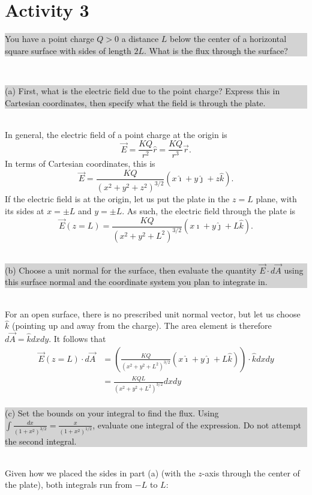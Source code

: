 \documentclass[]{article}
\newcommand{\excerpt}[1]{\colorbox{lightgray}{\parbox{14.8cm}{#1}} \\}
\begin{document}
\pagebreak
\section*{Activity 3}
\excerpt{
You have a point charge $ Q > 0 $ a distance $ L $ below the center of a horizontal square surface with sides of length $ 2L $. What is the flux through the surface?
}
\excerpt{
(a) First, what is the electric field due to the point charge? Express this in Cartesian coordinates, then specify what the field is through the plate.
}


In general, the electric field of a point charge at the origin is
\[
\vec{E} = \frac{KQ}{r^{2}}\hat{r} = \frac{KQ}{r^{3}}\vec{r}.
\]
In terms of Cartesian coordinates, this is
\[
\vec{E} = \frac{KQ}{(x^{2}+y^{2}+z^{2})^{3/2}}(x\hat{\imath}+y\hat{\jmath}+z\hat{k}).
\]
If the electric field is at the origin, let us put the plate in the $ z = L $ plane, with its sides at $ x = \pm L $ and $ y = \pm L $. As such, the electric field through the plate is
\[
\vec{E}(z=L) = \frac{KQ}{(x^{2}+y^{2}+L^{2})^{3/2}}(x\hat{\imath}+y\hat{\jmath}+L\hat{k}).
\] \\
\excerpt{
(b) Choose a unit normal for the surface, then evaluate the quantity $ \vec{E}\cdot d\vec{A} $ using this surface normal and the coordinate system you plan to integrate in.
}
For an open surface, there is no prescribed unit normal vector, but let us choose $ \hat{k} $ (pointing up and away from the charge). The area element is therefore $ d\vec{A} = \hat{k}dxdy $. It follows that
\[
\begin{split}
	\vec{E}(z=L)\cdot d\vec{A} & = \left(\frac{KQ}{(x^{2}+y^{2}+L^{2})^{3/2}}(x\hat{\imath}+y\hat{\jmath}+L\hat{k})\right)\cdot\hat{k}dxdy \\
	& = \frac{KQL}{(x^{2}+y^{2}+L^{2})^{3/2}}dxdy \\
\end{split}
\]
\excerpt{
(c) Set the bounds on your integral to find the flux. Using $ \int\frac{dx}{(1+x^{2})^{3/2}} = \frac{x}{(1+x^{2})^{1/2}} $, evaluate one integral of the expression. Do not attempt the second integral. \\
}
Given how we placed the sides in part (a) (with the $ z $-axis through the center of the plate), both integrals run from $ -L $ to $ L $:
\end{document}
